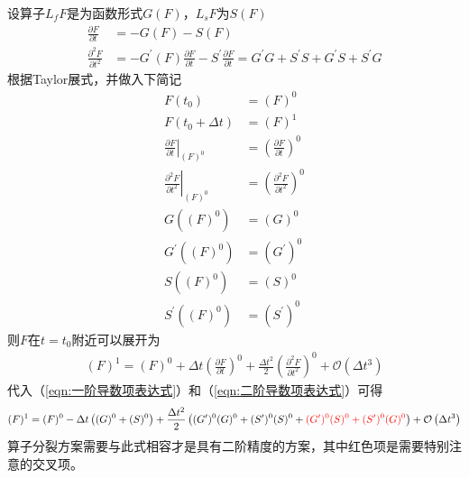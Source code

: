 \documentclass{ctexart}
\begin{document}
设算子$L_f F$是为函数形式$G(F)$，$L_s F$为$S(F)$
\begin{align}
  \frac{\partial F}{\partial t} & = - G(F) - S(F) \label{eqn:一阶导数项表达式} \\
  \frac{\partial^2 F}{\partial t^2} & = - G^\prime(F) \frac{\partial F}{\partial t} - S^\prime \frac{\partial F}{\partial t} = G^\prime G + S^\prime S + G^\prime S + S^\prime G \label{eqn:二阶导数项表达式}
\end{align}
根据Taylor展式，并做入下简记
\begin{align*}
  F(t_0) & = (F)^0 \\
  F(t_0 + \Delta{t}) & = (F)^1 \\
  \left. \frac{\partial F}{\partial t} \right|_{(F)^0} & = \left( \frac{\partial F}{\partial t} \right)^0 \\
  \left. \frac{\partial^2 F}{\partial t^2} \right|_{(F)^0} & = \left( \frac{\partial^2 F}{\partial t^2} \right)^0 \\
  G((F)^0) & = (G)^0 \\
  G^\prime((F)^0) & = (G^\prime)^0 \\
  S((F)^0) & = (S)^0 \\
  S^\prime((F)^0) & = (S^\prime)^0
\end{align*}
则$F$在$t = t_0$附近可以展开为
\begin{align}
  (F)^1 = (F)^0 + \Delta{t} \left( \frac{\partial F}{\partial t} \right)^0 + \frac{\Delta{t}^2}{2} \left( \frac{\partial^2 F}{\partial t^2} \right)^0 + \mathcal{O} \left( \Delta{t}^3 \right)
\end{align}
代入（\ref{eqn:一阶导数项表达式}）和（\ref{eqn:二阶导数项表达式}）可得
\begin{align}
  (F)^1 = (F)^0 - \Delta{t} \left( (G)^0 + (S)^0 \right) + \frac{\Delta{t}^2}{2} \left( (G^\prime)^0 (G)^0 + (S^\prime)^0 (S)^0 + {\color{red} (G^\prime)^0 (S)^0 + (S^\prime)^0 (G)^0} \right) + \mathcal{O} \left( \Delta{t}^3 \right) \label{eqn:算子分裂等式}
\end{align}
算子分裂方案需要与此式相容才是具有二阶精度的方案，其中红色项是需要特别注意的交叉项。
\end{document}
